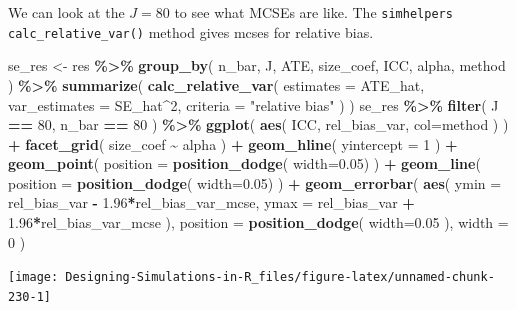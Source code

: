 \documentclass[
]{book}
\newenvironment{Shaded}{\begin{snugshade}}{\end{snugshade}}
\newcommand{\AttributeTok}[1]{\textcolor[rgb]{0.13,0.29,0.53}{#1}}
\newcommand{\DecValTok}[1]{\textcolor[rgb]{0.00,0.00,0.81}{#1}}
\newcommand{\FloatTok}[1]{\textcolor[rgb]{0.00,0.00,0.81}{#1}}
\newcommand{\FunctionTok}[1]{\textcolor[rgb]{0.13,0.29,0.53}{\textbf{#1}}}
\newcommand{\NormalTok}[1]{#1}
\newcommand{\OtherTok}[1]{\textcolor[rgb]{0.56,0.35,0.01}{#1}}
\newcommand{\SpecialCharTok}[1]{\textcolor[rgb]{0.81,0.36,0.00}{\textbf{#1}}}
\newcommand{\StringTok}[1]{\textcolor[rgb]{0.31,0.60,0.02}{#1}}
\begin{document}
We can look at the \(J = 80\) to see what MCSEs are like.
The \texttt{simhelpers} \texttt{calc\_relative\_var()} method gives mcses for relative bias.

\begin{Shaded}
\begin{Highlighting}[]
\NormalTok{se\_res }\OtherTok{\textless{}{-}}\NormalTok{ res }\SpecialCharTok{\%\textgreater{}\%}
  \FunctionTok{group\_by}\NormalTok{( n\_bar, J, ATE, size\_coef, ICC, alpha, method ) }\SpecialCharTok{\%\textgreater{}\%}
  \FunctionTok{summarize}\NormalTok{( }\FunctionTok{calc\_relative\_var}\NormalTok{( }\AttributeTok{estimates =}\NormalTok{ ATE\_hat,}
                     \AttributeTok{var\_estimates =}\NormalTok{ SE\_hat}\SpecialCharTok{\^{}}\DecValTok{2}\NormalTok{,}
                     \AttributeTok{criteria =} \StringTok{"relative bias"}\NormalTok{ ) )}
\NormalTok{se\_res }\SpecialCharTok{\%\textgreater{}\%}
  \FunctionTok{filter}\NormalTok{( J }\SpecialCharTok{==} \DecValTok{80}\NormalTok{, n\_bar }\SpecialCharTok{==} \DecValTok{80}\NormalTok{ ) }\SpecialCharTok{\%\textgreater{}\%}
  \FunctionTok{ggplot}\NormalTok{( }\FunctionTok{aes}\NormalTok{( ICC, rel\_bias\_var, }\AttributeTok{col=}\NormalTok{method ) ) }\SpecialCharTok{+}
  \FunctionTok{facet\_grid}\NormalTok{( size\_coef }\SpecialCharTok{\textasciitilde{}}\NormalTok{ alpha  ) }\SpecialCharTok{+} 
  \FunctionTok{geom\_hline}\NormalTok{( }\AttributeTok{yintercept =} \DecValTok{1}\NormalTok{ ) }\SpecialCharTok{+}
  \FunctionTok{geom\_point}\NormalTok{( }\AttributeTok{position =} \FunctionTok{position\_dodge}\NormalTok{( }\AttributeTok{width=}\FloatTok{0.05}\NormalTok{) ) }\SpecialCharTok{+}
  \FunctionTok{geom\_line}\NormalTok{( }\AttributeTok{position =} \FunctionTok{position\_dodge}\NormalTok{( }\AttributeTok{width=}\FloatTok{0.05}\NormalTok{) ) }\SpecialCharTok{+}
  \FunctionTok{geom\_errorbar}\NormalTok{( }\FunctionTok{aes}\NormalTok{( }\AttributeTok{ymin =}\NormalTok{ rel\_bias\_var }\SpecialCharTok{{-}} \FloatTok{1.96}\SpecialCharTok{*}\NormalTok{rel\_bias\_var\_mcse,}
                      \AttributeTok{ymax =}\NormalTok{ rel\_bias\_var }\SpecialCharTok{+} \FloatTok{1.96}\SpecialCharTok{*}\NormalTok{rel\_bias\_var\_mcse ),}
                 \AttributeTok{position =} \FunctionTok{position\_dodge}\NormalTok{( }\AttributeTok{width=}\FloatTok{0.05}\NormalTok{ ),}
                 \AttributeTok{width =} \DecValTok{0}\NormalTok{ )}
\end{Highlighting}
\end{Shaded}

\begin{center}\texttt{[image: Designing-Simulations-in-R\_files/figure-latex/unnamed-chunk-230-1]} \end{center}
\end{document}

